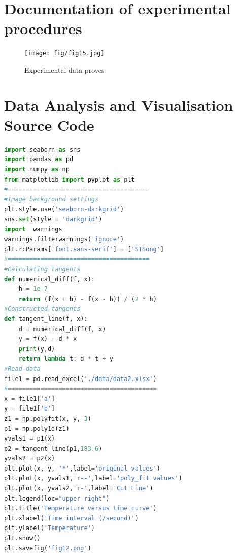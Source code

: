 \documentclass[UTF8]{article}
\begin{document}
\begin{appendix}
	\section{Documentation of experimental procedures}
	\begin{figure}[H]
		\centering
		\texttt{[image: fig/fig15.jpg]}
		\caption{Experimental data proves}
		\label{figure.14}
	\end{figure}
	
	\section{Data Analysis and Visualisation Source Code}
	\begin{lstlisting}[language=python]
import seaborn as sns
import pandas as pd
import numpy as np
from matplotlib import pyplot as plt
#=======================================
#Image background settings
plt.style.use('seaborn-darkgrid')
sns.set(style = 'darkgrid')
import  warnings
warnings.filterwarnings('ignore')
plt.rcParams['font.sans-serif'] = ['STSong']
#=======================================
#Calculating tangents
def numerical_diff(f, x):
    h = 1e-7
    return (f(x + h) - f(x - h)) / (2 * h)
#Constructed tangents
def tangent_line(f, x):
    d = numerical_diff(f, x)
    y = f(x) - d * x
    print(y,d)
    return lambda t: d * t + y
#Read data
file1 = pd.read_excel('./data/data2.xlsx')
#=========================================
x = file1['a']
y = file1['b']
z1 = np.polyfit(x, y, 3)
p1 = np.poly1d(z1)
yvals1 = p1(x)
p2 = tangent_line(p1,183.6)
yvals2 = p2(x)
plt.plot(x, y, '*',label='original values')
plt.plot(x, yvals1,'r--',label='poly_fit values')
plt.plot(x, yvals2,'r-',label='Cut Line')
plt.legend(loc="upper right")
plt.title('Temperature versus time curve')
plt.xlabel('Time interval (/second)')
plt.ylabel('Temperature')
plt.show()
plt.savefig('fig12.png')
	\end{lstlisting}

\end{appendix}
\end{document}
